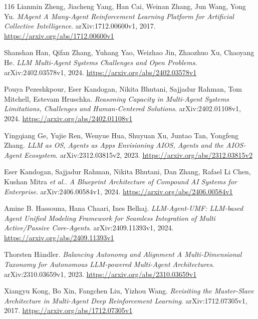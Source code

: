 \documentclass[11pt,a4paper]{article}
\begin{document}
\begin{thebibliography}{116}
Lianmin Zheng, Jiacheng Yang, Han Cai, Weinan Zhang, Jun Wang, Yong Yu.
\newblock \emph{MAgent A Many-Agent Reinforcement Learning Platform for Artificial Collective Intelligence}.
\newblock arXiv:1712.00600v1, 2017.
\newblock \url{https://arxiv.org/abs/1712.00600v1}

Shanshan Han, Qifan Zhang, Yuhang Yao, Weizhao Jin, Zhaozhuo Xu, Chaoyang He.
\newblock \emph{LLM Multi-Agent Systems Challenges and Open Problems}.
\newblock arXiv:2402.03578v1, 2024.
\newblock \url{https://arxiv.org/abs/2402.03578v1}

Pouya Pezeshkpour, Eser Kandogan, Nikita Bhutani, Sajjadur Rahman, Tom Mitchell, Estevam Hruschka.
\newblock \emph{Reasoning Capacity in Multi-Agent Systems Limitations, Challenges and Human-Centered Solutions}.
\newblock arXiv:2402.01108v1, 2024.
\newblock \url{https://arxiv.org/abs/2402.01108v1}

Yingqiang Ge, Yujie Ren, Wenyue Hua, Shuyuan Xu, Juntao Tan, Yongfeng Zhang.
\newblock \emph{LLM as OS, Agents as Apps Envisioning AIOS, Agents and the AIOS-Agent Ecosystem}.
\newblock arXiv:2312.03815v2, 2023.
\newblock \url{https://arxiv.org/abs/2312.03815v2}

Eser Kandogan, Sajjadur Rahman, Nikita Bhutani, Dan Zhang, Rafael Li Chen, Kushan Mitra \emph{et al.}.
\newblock \emph{A Blueprint Architecture of Compound AI Systems for Enterprise}.
\newblock arXiv:2406.00584v1, 2024.
\newblock \url{https://arxiv.org/abs/2406.00584v1}

Amine B. Hassouna, Hana Chaari, Ines Belhaj.
\newblock \emph{LLM-Agent-UMF: LLM-based Agent Unified Modeling Framework for Seamless Integration of Multi Active/Passive Core-Agents}.
\newblock arXiv:2409.11393v1, 2024.
\newblock \url{https://arxiv.org/abs/2409.11393v1}

Thorsten H\"{a}ndler.
\newblock \emph{Balancing Autonomy and Alignment A Multi-Dimensional Taxonomy for Autonomous LLM-powered Multi-Agent Architectures}.
\newblock arXiv:2310.03659v1, 2023.
\newblock \url{https://arxiv.org/abs/2310.03659v1}

Xiangyu Kong, Bo Xin, Fangchen Liu, Yizhou Wang.
\newblock \emph{Revisiting the Master-Slave Architecture in Multi-Agent Deep Reinforcement Learning}.
\newblock arXiv:1712.07305v1, 2017.
\newblock \url{https://arxiv.org/abs/1712.07305v1}


\end{thebibliography}
\end{document}
